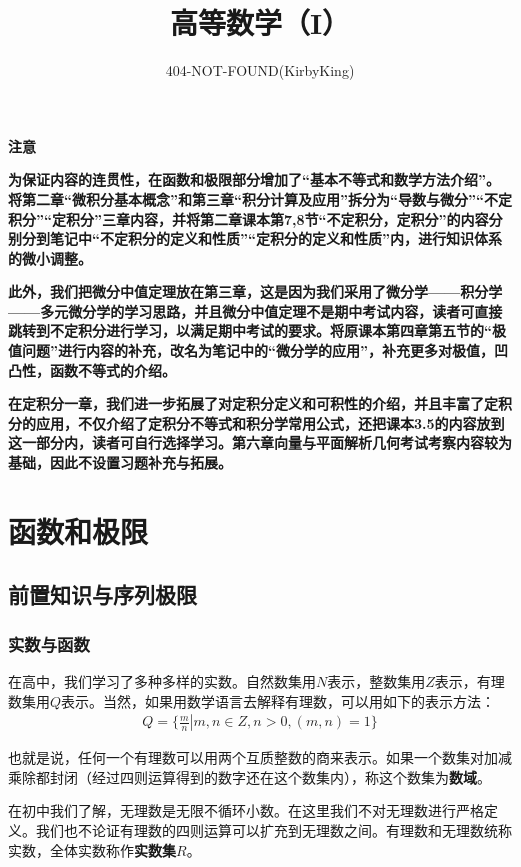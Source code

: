\documentclass{ctexart}
\title{高等数学（I）}
\author{404-NOT-FOUND(KirbyKing)}
\let\oldtextbf\textbf %
\renewcommand{\textbf}[1]{\textcolor{btex}{\oldtextbf{#1}}} %
\renewenvironment{abstract}{%
    \vspace{1em} %
    \begin{center}
        {\color{bsec} \large \textbf{注意}} %
    \end{center}
    \quotation %
}{\endquotation}
\begin{document}
\maketitle
\tableofcontents

\begin{abstract}
   \textbf{ 为保证内容的连贯性，在函数和极限部分增加了“基本不等式和数学方法介绍”。将第二章“微积分基本概念”和第三章“积分计算及应用”拆分为“导数与微分”“不定积分”“定积分”三章内容，并将第二章课本第7,8节“不定积分，定积分”的内容分别分到笔记中“不定积分的定义和性质”“定积分的定义和性质”内，进行知识体系的微小调整。}
   
  \textbf{ 此外，我们把微分中值定理放在第三章，这是因为我们采用了微分学——积分学——多元微分学的学习思路，并且微分中值定理不是期中考试内容，读者可直接跳转到不定积分进行学习，以满足期中考试的要求。将原课本第四章第五节的“极值问题”进行内容的补充，改名为笔记中的“微分学的应用”，补充更多对极值，凹凸性，函数不等式的介绍。}

  \textbf{在定积分一章，我们进一步拓展了对定积分定义和可积性的介绍，并且丰富了定积分的应用，不仅介绍了定积分不等式和积分学常用公式，还把课本3.5的内容放到这一部分内，读者可自行选择学习。第六章向量与平面解析几何考试考察内容较为基础，因此不设置习题补充与拓展。}
\end{abstract}
\clearpage

\section{函数和极限}
\subsection{前置知识与序列极限}
\subsubsection{实数与函数}
在高中，我们学习了多种多样的实数。自然数集用$N$表示，整数集用$Z$表示，有理数集用$Q$表示。当然，如果用数学语言去解释有理数，可以用如下的表示方法：
\begin{align*}
    Q=\{\frac{m}{n}\left.\right|m,n\in Z, n>0,(m,n)=1\}
\end{align*}

也就是说，任何一个有理数可以用两个互质整数的商来表示。如果一个数集对加减乘除都封闭（经过四则运算得到的数字还在这个数集内），称这个数集为\textbf{\color{btex}数域}。

在初中我们了解，无理数是无限不循环小数。在这里我们不对无理数进行严格定义。我们也不论证有理数的四则运算可以扩充到无理数之间。有理数和无理数统称实数，全体实数称作\textbf{\color{btex}实数集$R$}。
\end{document}
